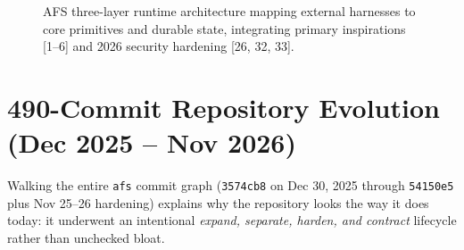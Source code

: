 \documentclass[10pt,letterpaper]{article}
\newcommand{\code}[1]{\texttt{\color{InkNavy}#1}}
\begin{document}
\begin{figure}[ht!]
{%
}
\caption{AFS three-layer runtime architecture mapping external harnesses to core primitives and durable state, integrating primary inspirations [1--6] and 2026 security hardening [26, 32, 33].}
\label{fig:arch}
\end{figure}

\section{490-Commit Repository Evolution (Dec 2025 -- Nov 2026)}

Walking the entire \code{afs} commit graph (\code{3574cb8} on Dec 30, 2025 through \code{54150e5} plus Nov 25--26 hardening) explains why the repository looks the way it does today: it underwent an intentional \emph{expand, separate, harden, and contract} lifecycle rather than unchecked bloat.
\end{document}
